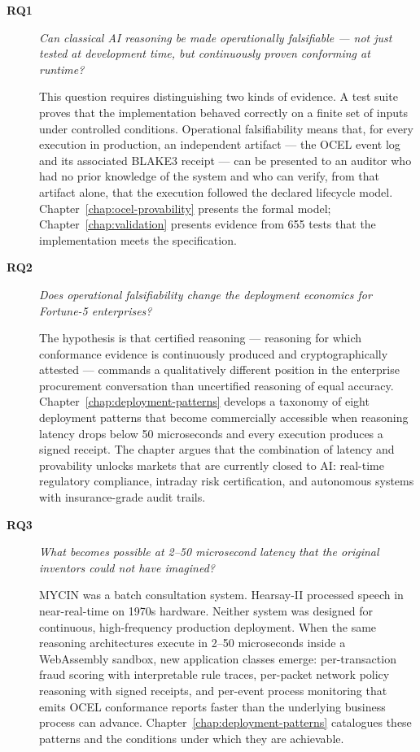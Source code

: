 \begin{description}

\item[\textbf{RQ1}] \emph{Can classical AI reasoning be made operationally falsifiable ---
not just tested at development time, but continuously proven conforming at runtime?}

This question requires distinguishing two kinds of evidence.
A test suite proves that the implementation behaved correctly on a finite set of inputs
under controlled conditions.
Operational falsifiability means that, for every execution in production, an independent
artifact --- the OCEL event log and its associated BLAKE3 receipt --- can be presented to
an auditor who had no prior knowledge of the system and who can verify, from that artifact
alone, that the execution followed the declared lifecycle model.
Chapter~\ref{chap:ocel-provability} presents the formal model; Chapter~\ref{chap:validation}
presents evidence from 655 tests that the implementation meets the specification.

\item[\textbf{RQ2}] \emph{Does operational falsifiability change the deployment economics
for Fortune-5 enterprises?}

The hypothesis is that certified reasoning --- reasoning for which conformance evidence
is continuously produced and cryptographically attested --- commands a qualitatively
different position in the enterprise procurement conversation than uncertified reasoning
of equal accuracy.
Chapter~\ref{chap:deployment-patterns} develops a taxonomy of eight deployment patterns
that become commercially accessible when reasoning latency drops below 50 microseconds
and every execution produces a signed receipt.
The chapter argues that the combination of latency and provability unlocks markets that
are currently closed to AI: real-time regulatory compliance, intraday risk certification,
and autonomous systems with insurance-grade audit trails.

\item[\textbf{RQ3}] \emph{What becomes possible at 2--50 microsecond latency that the
original inventors could not have imagined?}

MYCIN was a batch consultation system.
Hearsay-II processed speech in near-real-time on 1970s hardware.
Neither system was designed for continuous, high-frequency production deployment.
When the same reasoning architectures execute in 2--50 microseconds inside a WebAssembly
sandbox, new application classes emerge: per-transaction fraud scoring with interpretable
rule traces, per-packet network policy reasoning with signed receipts, and per-event
process monitoring that emits OCEL conformance reports faster than the underlying business
process can advance.
Chapter~\ref{chap:deployment-patterns} catalogues these patterns and the conditions under
which they are achievable.

\end{description}

